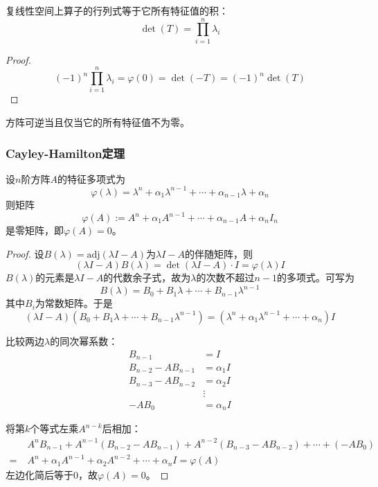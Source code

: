 \begin{theorem}
复线性空间上算子的行列式等于它所有特征值的积：
\[
\det(T) = \prod_{i=1}^{n}\lambda_i
\]
\end{theorem}

\begin{proof}
\[
(-1)^n\prod_{i=1}^{n}\lambda_i = \varphi(0) = \det(-T) = (-1)^n\det(T)
\]
\end{proof}

\begin{corollary}
方阵可逆当且仅当它的所有特征值不为零。
\end{corollary}

\subsubsection{Cayley-Hamilton定理}

\begin{theorem}
设$n$阶方阵$A$的特征多项式为
\[
\varphi(\lambda) = \lambda^n + \alpha_1\lambda^{n-1} + \cdots + \alpha_{n-1}\lambda + \alpha_n
\]
则矩阵
\[
\varphi(A) := A^n + \alpha_1 A^{n-1} + \cdots + \alpha_{n-1}A + \alpha_n I_n
\]
是零矩阵，即$\varphi(A) = 0$。
\end{theorem}

\begin{proof}
设$B(\lambda) = \mathrm{adj}(\lambda I - A)$为$\lambda I - A$的伴随矩阵，则
\[
(\lambda I - A)B(\lambda) = \det(\lambda I - A) \cdot I = \varphi(\lambda)I
\]
$B(\lambda)$的元素是$\lambda I - A$的代数余子式，故为$\lambda$的次数不超过$n-1$的多项式。可写为
\[
B(\lambda) = B_0 + B_1\lambda + \cdots + B_{n-1}\lambda^{n-1}
\]
其中$B_i$为常数矩阵。于是
\[
(\lambda I - A)(B_0 + B_1\lambda + \cdots + B_{n-1}\lambda^{n-1}) = (\lambda^n + \alpha_1\lambda^{n-1} + \cdots + \alpha_n)I
\]

比较两边$\lambda$的同次幂系数：
\begin{align*}
B_{n-1} &= I \\
B_{n-2} - AB_{n-1} &= \alpha_1 I \\
B_{n-3} - AB_{n-2} &= \alpha_2 I \\
&\vdots \\
-AB_0 &= \alpha_n I
\end{align*}

将第$k$个等式左乘$A^{n-k}$后相加：
\begin{align*}
& A^n B_{n-1} + A^{n-1}(B_{n-2} - AB_{n-1}) + A^{n-2}(B_{n-3} - AB_{n-2}) + \cdots + (-AB_0) \\
=\;& A^n + \alpha_1 A^{n-1} + \alpha_2 A^{n-2} + \cdots + \alpha_n I = \varphi(A)
\end{align*}
左边化简后等于$0$，故$\varphi(A) = 0$。
\end{proof}

